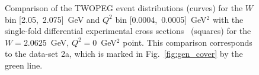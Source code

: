 \begin{figure}[!ht]
\begin{center}
\end{center}
\vspace{-0.6cm}
\caption{\small Comparison of the TWOPEG event distributions (curves) for the $W$ bin [2.05,~2.075]~GeV and $Q^2$ bin [0.0004,~0.0005]~GeV$^2$ with the single-fold differential experimental cross sections~\cite{Golovach:note} (squares) for the $W = 2.0625$~GeV, $Q^2 = 0$~GeV$^2$ point. This comparison corresponds to the data-set 2a, which is marked in Fig.~\ref{fig:gen_cover} by the green line.}
\label{fig:eg_gol_20625}
\end{figure}


